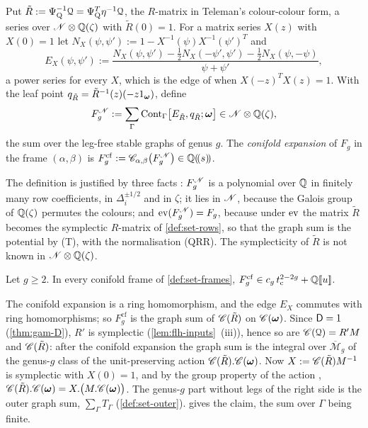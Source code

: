 \begin{defn}
\label{def:mai-Fcf}
Put $\tilde R:=\Psi_{\mathrm Q}^{-1}\mathcal{Q}=\Psi_{\mathrm Q}^T\eta^{-1}\mathcal{Q}$, the $R$-matrix in Teleman's colour-colour form, a series over $\mathscr{N}\otimes\mathbb{Q}(\zeta)$ with $\tilde R(0)=1$. For a matrix series $X(z)$ with $X(0)=1$ let $N_X(\psi,\psi'):=1-X^{-1}(\psi)X^{-1}(\psi')^T$ and
\[
E_X(\psi,\psi'):=\frac{N_X(\psi,\psi')-\frac12N_X(-\psi',\psi')-\frac12N_X(\psi,-\psi)}{\psi+\psi'} ,
\]
a power series for every $X$, which is the edge of \cite[Def.~2.2]{PPZ15} when $X(-z)^TX(z)=1$. With the leaf point $q_{\tilde R}=\tilde R^{-1}(z)(-z1_{\boldsymbol{\omega}})$, define
\[
F_g^{\mathscr{N}}:=\sum_\Gamma\mathrm{Cont}_\Gamma\bigl[E_{\tilde R},q_{\tilde R};\boldsymbol{\omega}\bigr]\in\mathscr{N}\otimes\mathbb{Q}(\zeta),
\]
the sum over the leg-free stable graphs of genus $g$. The \emph{conifold expansion} of $F_g$ in the frame $(\alpha,\beta)$ is $F_g^{\mathrm{cf}}:=\mathscr{C}_{\alpha,\beta}\bigl(F_g^{\mathscr{N}}\bigr)\in\mathbb{Q}(\!(s)\!)$.
\end{defn}

The definition is justified by three facts : $F_g^{\mathscr{N}}$ is a polynomial over $\mathbb{Q}$ in finitely many row coefficients, in $\Delta_i^{\pm1/2}$ and in $\zeta$; it lies in $\mathscr{N}$, because the Galois group of $\mathbb{Q}(\zeta)$ permutes the colours; and $\operatorname{ev}(F_g^{\mathscr{N}})=F_g$, because under $\operatorname{ev}$ the matrix $\tilde R$ becomes the symplectic $R$-matrix of \cref{def:set-rows}, so that the graph sum is the potential by (T), with the normalisation (QRR). The symplecticity of $\tilde R$ is not known in $\mathscr{N}\otimes\mathbb{Q}(\zeta)$.

\begin{cor}
\label{cor:mai-gap}
Let $g\geq2$. In every conifold frame of \cref{def:set-frames}, $F_g^{\mathrm{cf}}\in c_g\,t_{\mathrm{c}}^{2-2g}+\mathbb{Q}[\![ u ]\!]$.
\end{cor}

\begin{sketch}
The conifold expansion is a ring homomorphism, and the edge $E_X$ commutes with ring homomorphisms; so $F_g^{\mathrm{cf}}$ is the graph sum of $\mathscr{C}(\tilde R)$ on $\mathscr{C}(\boldsymbol{\omega})$. Since $\mathsf{D}=1$ (\cref{thm:gam-D}), $R'$ is symplectic (\cref{lem:flh-inputs}~(iii)), hence so are $\mathscr{C}(\mathcal{Q})=R'M$ and $\mathscr{C}(\tilde R)$: after the conifold expansion the graph sum is the integral over $\overline{\mathcal M}_g$ of the genus-$g$ class of the unit-preserving action $\mathscr{C}(\tilde R).\mathscr{C}(\boldsymbol{\omega})$. Now $X:=\mathscr{C}(\tilde R)M^{-1}$ is symplectic with $X(0)=1$, and by the group property of the action \cite[Prop.~2.14]{PPZ15}, $\mathscr{C}(\tilde R).\mathscr{C}(\boldsymbol{\omega})=X.\bigl(M.\mathscr{C}(\boldsymbol{\omega})\bigr)$. The genus-$g$ part without legs of the right side is the outer graph sum, $\sum_\Gamma T_\Gamma$ (\cref{def:set-outer}).  gives the claim, the sum over $\Gamma$ being finite.
\end{sketch}

